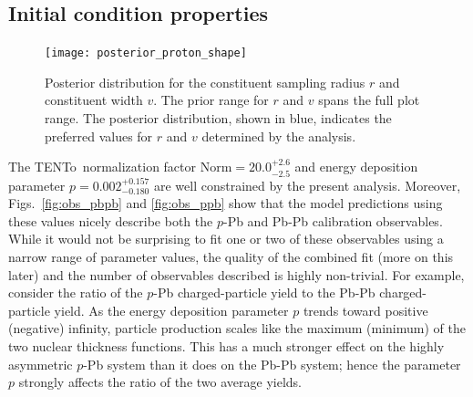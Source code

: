 \documentclass[aps,prc,reprint,amsmath,nofootinbib]{revtex4-1}
\newcommand{\trento}{T\raisebox{-0.5ex}{R}ENTo}
\newenvironment{fullpage}{\onecolumngrid}{\clearpage\twocolumngrid}
\begin{document}
\begin{fullpage}
  \begin{figure}
  \end{figure}
  \captionsetup{skip=-15pt, width=\textwidth}
\end{fullpage}

\subsection{Initial condition properties}

\begin{figure}
  \texttt{[image: posterior\_proton\_shape]}
  \caption{
    \label{fig:posterior_proton_shape}
    Posterior distribution for the constituent sampling radius $r$ and constituent width $v$.
    The prior range for $r$ and $v$ spans the full plot range.
    The posterior distribution, shown in blue, indicates the preferred values for $r$ and $v$ determined by the analysis.
  }
\end{figure}

The \trento\ normalization factor ${\text{Norm} = 20.0^{+2.6}_{-2.5}}$ and energy deposition parameter $p=0.002^{+0.157}_{-0.180}$ are well constrained by the present analysis.
Moreover, Figs.~\ref{fig:obs_pbpb} and \ref{fig:obs_ppb} show that the model predictions using these values nicely describe both the $p$-Pb and Pb-Pb calibration observables.
While it would not be surprising to fit one or two of these observables using a narrow range of parameter values, the quality of the combined fit (more on this later) and the number of observables described is highly non-trivial.
For example, consider the ratio of the $p$-Pb charged-particle yield to the Pb-Pb charged-particle yield.
As the energy deposition parameter $p$ trends toward positive (negative) infinity, particle production scales like the maximum (minimum) of the two nuclear thickness functions.
This has a much stronger effect on the highly asymmetric $p$-Pb system than it does on the Pb-Pb system; hence the parameter $p$ strongly affects the ratio of the two average yields.
\end{document}
